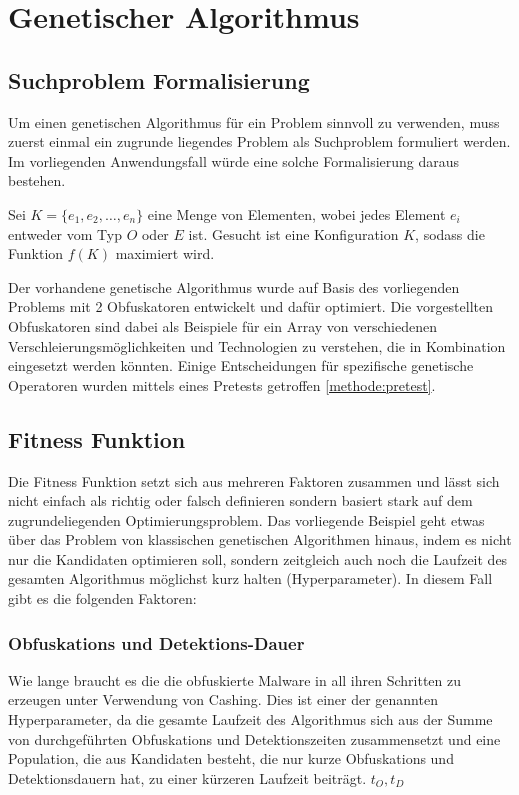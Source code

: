 \section{Genetischer Algorithmus}
\label{Sec:GeneticAlgorithmDetail}
\subsection{Suchproblem Formalisierung}
Um einen genetischen Algorithmus für ein Problem sinnvoll zu verwenden, muss zuerst einmal ein zugrunde liegendes Problem als Suchproblem formuliert werden. Im vorliegenden Anwendungsfall würde eine solche Formalisierung daraus bestehen.
    

Sei $K = \{e_1, e_2, \ldots, e_n\}$ eine Menge von Elementen, wobei jedes Element $e_i$ entweder vom Typ $O$ oder $E$ ist. Gesucht ist eine Konfiguration $K$, sodass die Funktion $f(K)$ maximiert wird.

Der vorhandene genetische Algorithmus wurde auf Basis des vorliegenden Problems mit 2 Obfuskatoren entwickelt und dafür optimiert. Die vorgestellten Obfuskatoren sind dabei als Beispiele für ein Array von verschiedenen Verschleierungsmöglichkeiten und Technologien zu verstehen, die in Kombination eingesetzt werden könnten. Einige Entscheidungen für spezifische genetische Operatoren wurden mittels eines Pretests getroffen \ref{methode:pretest}.

\subsection{Fitness Funktion}
Die Fitness Funktion setzt sich aus mehreren Faktoren zusammen und lässt sich nicht einfach als richtig oder falsch definieren sondern basiert stark auf dem zugrundeliegenden Optimierungsproblem. Das vorliegende Beispiel geht etwas über das Problem von klassischen genetischen Algorithmen hinaus, indem es nicht nur die Kandidaten optimieren soll, sondern zeitgleich auch noch die Laufzeit des gesamten Algorithmus möglichst kurz halten (Hyperparameter).
In diesem Fall gibt es die folgenden Faktoren:

    \subsubsection{Obfuskations und Detektions-Dauer}
    Wie lange braucht es die die obfuskierte Malware in all ihren Schritten zu erzeugen unter Verwendung von Cashing. Dies ist einer der genannten Hyperparameter, da die gesamte Laufzeit des Algorithmus sich aus der Summe von durchgeführten Obfuskations und Detektionszeiten zusammensetzt und eine Population, die aus Kandidaten besteht, die nur kurze Obfuskations und Detektionsdauern hat, zu einer kürzeren Laufzeit beiträgt. $t_O,  t_D$
    
